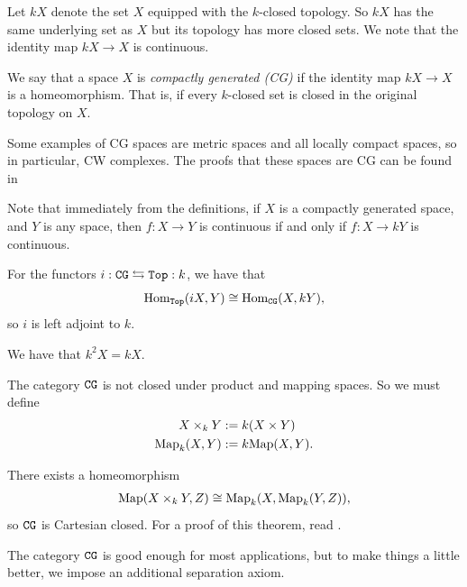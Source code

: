 \documentclass{article}[11pt]
\begin{document}
Let $kX$ denote the set $X$ equipped with the $k$-closed topology. So $kX$ has the same underlying set as $X$ but its topology has more closed sets. We note that the identity map $kX \to X$ is continuous.

\begin{definition} We say that a space $X$ is \textit{compactly generated (CG)} if the identity map $kX \to X$ is a homeomorphism. That is, if every $k$-closed set is closed in the original topology on $X$.
\end{definition}

Some examples of CG spaces are metric spaces and all locally compact spaces, so in particular, CW complexes. The proofs that these spaces are CG can be found in \cite[Propositions 1.6, 1.7]{Strickland-cgwh}


Note that immediately from the definitions, if $X$ is a compactly generated space, and $Y$ is any space, then $f: X \to Y$ is continuous if and only if $f: X \to kY$ is continuous. 

\begin{upshot} For the functors $i:\texttt{CG} \leftrightarrows \texttt{Top}:k$, we have that
\[
	\textup{Hom}_{\texttt{Top}} (iX,Y) \cong \textup{Hom}_{\texttt{CG}} (X, kY),
\]
so $i$ is left adjoint to $k$.

\end{upshot}



\begin{note} We have that $k^2 X = kX$.
\end{note}

\begin{note} The category $\texttt{CG}$ is not closed under product and mapping spaces. So we must define
\begin{align*}
	X\times_k Y &:= k(X\times Y) \\
	\textup{Map}_k (X,Y) &:= k\textup{Map}(X,Y).
\end{align*}
\end{note}

\begin{theorem} There exists a homeomorphism
\begin{align*}
	\textup{Map}(X\times_k Y, Z) \cong \textup{Map}_k (X, \textup{Map}_k (Y,Z)),
\end{align*}
so $\texttt{CG}$ is Cartesian closed. For a proof of this theorem, read \cite[Proposition 2.11]{Strickland-cgwh}.
\end{theorem}

The category $\texttt{CG}$ is good enough for most applications, but to make things a little better, we impose an additional separation axiom.
\end{document}
